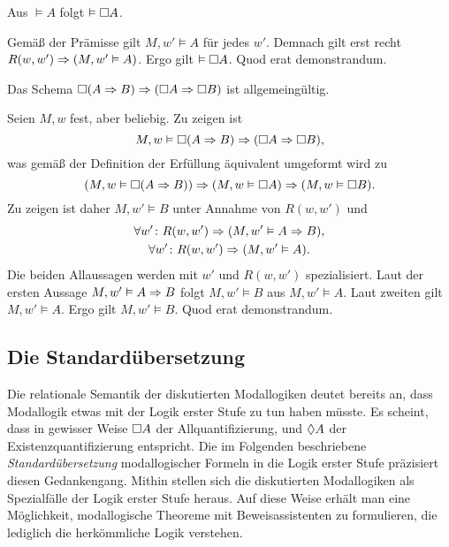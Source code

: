 \begin{Satz}
Aus $\models A$ folgt $\vDash\Box A$.
\end{Satz}
\begin{Beweis}
Gemäß der Prämisse gilt $M,w'\models A$ für jedes $w'$. Demnach gilt
erst recht $R(w,w')\Rightarrow (M,w'\vDash A)$. Ergo gilt
$\vDash\Box A$. Quod erat demonstrandum.\,\qedsymbol
\end{Beweis}

\begin{Satz}
Das Schema $\Box(A\Rightarrow B)\Rightarrow (\Box A\Rightarrow\Box B)$ ist allgemeingültig.
\end{Satz}
\begin{Beweis}
Seien $M,w$ fest, aber beliebig. Zu zeigen ist
\[M,w\vDash\Box(A\Rightarrow B)\Rightarrow (\Box A\Rightarrow\Box B),\]
was gemäß der Definition der Erfüllung äquivalent umgeformt wird zu%
\[(M,w\vDash\Box(A\Rightarrow B))\Rightarrow (M,w\vDash\Box A)\Rightarrow (M,w\vDash\Box B).\]
Zu zeigen ist daher $M,w'\models B$ unter Annahme von $R(w,w')$ und%
\begin{gather*}
\forall w'\colon R(w,w')\Rightarrow (M,w'\vDash A\Rightarrow B),\\
\forall w'\colon R(w,w')\Rightarrow (M,w'\vDash A).
\end{gather*}
Die beiden Allaussagen werden mit $w'$ und $R(w,w')$ spezialisiert.
Laut der ersten Aussage $M,w'\vDash A\Rightarrow B$ folgt
$M,w'\models B$ aus $M,w'\models A$. Laut zweiten gilt $M,w'\models A$.
Ergo gilt $M,w'\models B$. Quod erat demonstrandum.\,\qedsymbol
\end{Beweis}

\subsection{Die Standardübersetzung}

Die relationale Semantik der diskutierten Modallogiken deutet bereits
an, dass Modallogik etwas mit der Logik erster Stufe zu tun haben müsste.
Es scheint, dass in gewisser Weise $\Box A$ der Allquantifizierung,
und $\Diamond A$ der Existenzquantifizierung entspricht. Die im Folgenden
beschriebene \emph{Standardübersetzung} modallogischer Formeln in die
Logik erster Stufe präzisiert diesen Gedankengang. Mithin stellen sich
die diskutierten Modallogiken als Spezialfälle der Logik erster Stufe
heraus. Auf diese Weise erhält man eine Möglichkeit, modallogische
Theoreme mit Beweisassistenten zu formulieren, die lediglich die
herkömmliche Logik verstehen.

